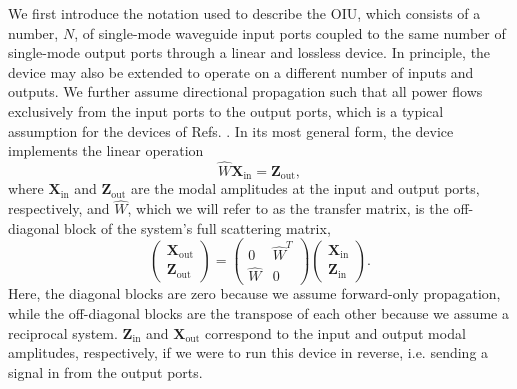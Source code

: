 We first introduce the notation used to describe the OIU, which consists of a number, $N$, of single-mode waveguide input ports coupled to the same number of single-mode output ports through a linear and lossless device. In principle, the device may also be extended to operate on a different number of inputs and outputs. We further assume directional propagation such that all power flows exclusively from the input ports to the output ports, which is a typical assumption for the devices of Refs. \cite{Miller2013a, Shen2017, Harris2017, Carolan2015, Reck1994,Miller2013,Clements2016}. In its most general form, the device implements the linear operation
\begin{equation}
\hat{W}\mathbf{X}_\textrm{in} = \mathbf{Z}_\textrm{out},
\label{eq:original_linear_system}
\end{equation}
where $\mathbf{X}_\textrm{in}$ and $\mathbf{Z}_\textrm{out}$ are the modal amplitudes at the input and output ports, respectively, and $\hat{W}$, which we will refer to as the transfer matrix, is the off-diagonal block of the system's full scattering matrix,
\begin{equation}
\begin{pmatrix}
\mathbf{X}_\textrm{out} \\
\mathbf{Z}_\textrm{out}
\end{pmatrix} = \begin{pmatrix}
0 & \hat{W}^T \\
\hat{W} & 0
\end{pmatrix}  
\begin{pmatrix}
\mathbf{X}_\textrm{in} \\
\mathbf{Z}_\textrm{in}
\end{pmatrix}.
\label{eq:smatrix}
\end{equation}
Here, the diagonal blocks are zero because we assume forward-only propagation, while the off-diagonal blocks are the transpose of each other because we assume a reciprocal system. $\mathbf{Z}_\textrm{in}$ and $\mathbf{X}_\textrm{out}$ correspond to the input and output modal amplitudes, respectively, if we were to run this device in reverse, i.e. sending a signal in from the output ports.


